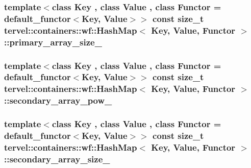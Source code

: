 \subsubsection[{primary\+\_\+array\+\_\+size\+\_\+}]{\setlength{\rightskip}{0pt plus 5cm}template$<$class Key , class Value , class Functor  = default\+\_\+functor$<$\+Key, Value$>$$>$ const size\+\_\+t {\bf tervel\+::containers\+::wf\+::\+Hash\+Map}$<$ Key, {\bf Value}, Functor $>$\+::primary\+\_\+array\+\_\+size\+\_\+\hspace{0.3cm}{\ttfamily [private]}}\label{classtervel_1_1containers_1_1wf_1_1_hash_map_a33e402d5fcf528ee13dbe5aa3f893fa2}
\hypertarget{classtervel_1_1containers_1_1wf_1_1_hash_map_a0db3b6f46ecf2ac2c243ee76edf0a4f5}{}
\subsubsection[{secondary\+\_\+array\+\_\+pow\+\_\+}]{\setlength{\rightskip}{0pt plus 5cm}template$<$class Key , class Value , class Functor  = default\+\_\+functor$<$\+Key, Value$>$$>$ const size\+\_\+t {\bf tervel\+::containers\+::wf\+::\+Hash\+Map}$<$ Key, {\bf Value}, Functor $>$\+::secondary\+\_\+array\+\_\+pow\+\_\+\hspace{0.3cm}{\ttfamily [private]}}\label{classtervel_1_1containers_1_1wf_1_1_hash_map_a0db3b6f46ecf2ac2c243ee76edf0a4f5}
\hypertarget{classtervel_1_1containers_1_1wf_1_1_hash_map_ac9a43fdb98927d0147a1240bd882e70b}{}
\subsubsection[{secondary\+\_\+array\+\_\+size\+\_\+}]{\setlength{\rightskip}{0pt plus 5cm}template$<$class Key , class Value , class Functor  = default\+\_\+functor$<$\+Key, Value$>$$>$ const size\+\_\+t {\bf tervel\+::containers\+::wf\+::\+Hash\+Map}$<$ Key, {\bf Value}, Functor $>$\+::secondary\+\_\+array\+\_\+size\+\_\+\hspace{0.3cm}{\ttfamily [private]}}\label{classtervel_1_1containers_1_1wf_1_1_hash_map_ac9a43fdb98927d0147a1240bd882e70b}
\hypertarget{classtervel_1_1containers_1_1wf_1_1_hash_map_a88bcdcb8728735910311f62e99027385}{}
